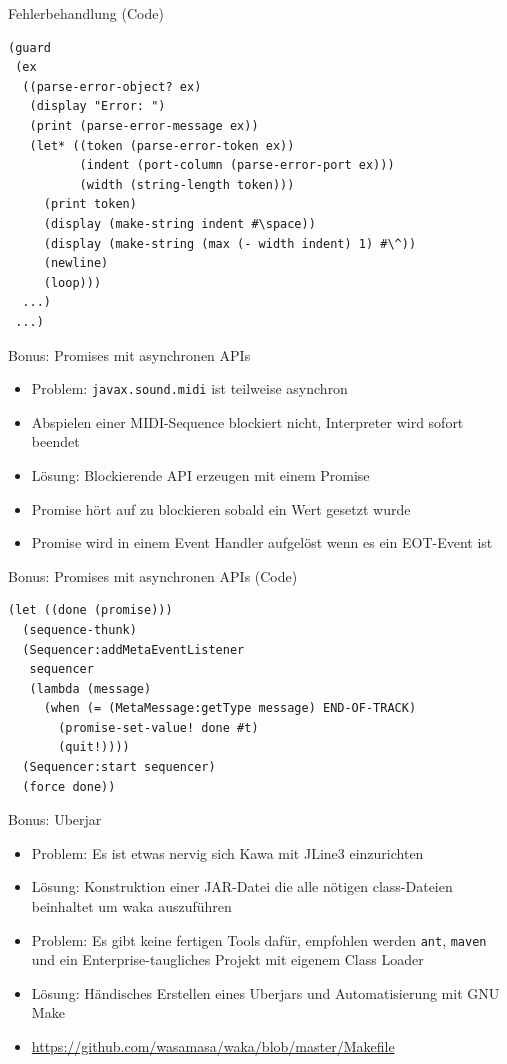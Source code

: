 \documentclass[presentation]{beamer}
\begin{document}
\begin{frame}[fragile,label=sec-4-16]{Fehlerbehandlung (Code)}
 \begin{verbatim}
(guard
 (ex
  ((parse-error-object? ex)
   (display "Error: ")
   (print (parse-error-message ex))
   (let* ((token (parse-error-token ex))
          (indent (port-column (parse-error-port ex)))
          (width (string-length token)))
     (print token)
     (display (make-string indent #\space))
     (display (make-string (max (- width indent) 1) #\^))
     (newline)
     (loop)))
  ...)
 ...)
\end{verbatim}
\end{frame}

\begin{frame}[fragile,label=sec-4-17]{Bonus: Promises mit asynchronen APIs}
 \begin{itemize}
\item Problem: \texttt{javax.sound.midi} ist teilweise asynchron
\item Abspielen einer MIDI-Sequence blockiert nicht, Interpreter wird
sofort beendet
\item Lösung: Blockierende API erzeugen mit einem Promise
\item Promise hört auf zu blockieren sobald ein Wert gesetzt wurde
\item Promise wird in einem Event Handler aufgelöst wenn es ein EOT-Event
ist
\end{itemize}
\end{frame}

\begin{frame}[fragile,label=sec-4-18]{Bonus: Promises mit asynchronen APIs (Code)}
 \begin{verbatim}
(let ((done (promise)))
  (sequence-thunk)
  (Sequencer:addMetaEventListener
   sequencer
   (lambda (message)
     (when (= (MetaMessage:getType message) END-OF-TRACK)
       (promise-set-value! done #t)
       (quit!))))
  (Sequencer:start sequencer)
  (force done))
\end{verbatim}
\end{frame}

\begin{frame}[fragile,label=sec-4-19]{Bonus: Uberjar}
 \begin{itemize}
\item Problem: Es ist etwas nervig sich Kawa mit JLine3 einzurichten
\item Lösung: Konstruktion einer JAR-Datei die alle nötigen class-Dateien
beinhaltet um waka auszuführen
\item Problem: Es gibt keine fertigen Tools dafür, empfohlen werden \texttt{ant},
\texttt{maven} und ein Enterprise-taugliches Projekt mit eigenem Class Loader
\item Lösung: Händisches Erstellen eines Uberjars und Automatisierung mit
GNU Make
\item \url{https://github.com/wasamasa/waka/blob/master/Makefile}
\end{itemize}
\end{frame}
\end{document}

